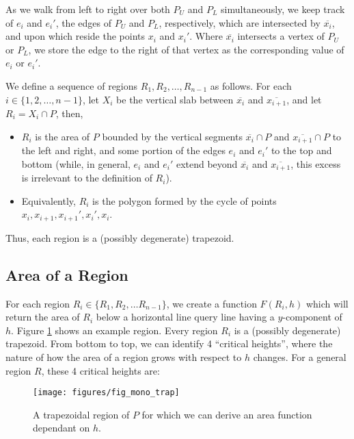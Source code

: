 As we walk from left to right over both $P_U$ and $P_L$ simultaneously, we keep track of $e_i$ and $e_i'$, the edges of $P_U$ and $P_L$, respectively, which are intersected by $\overline{x_i}$, and upon which reside the points $x_i$ and $x_i'$. Where $\overline{x_i}$ intersects a vertex of $P_U$ or $P_L$, 
we store the edge to the right of that vertex as the corresponding value of $e_i$ or $e_i'$.

We define a sequence of regions $R_1, R_2, \dots, R_{n-1}$ as follows. For each $i \in \{1, 2, \ldots, n-1\}$, let $X_i$ be the vertical slab between $\overline{x_i}$ and $\overline{x_{i+1}}$, and let $R_i = X_i \cap P$, then,

\begin{itemize}
 \item $R_i$ is the area of $P$ bounded by the vertical segments $\overline{x_i} \cap P$ and $\overline{x_{i+1}} \cap P$ to the left and right, and some portion of the edges $e_i$ and $e_i'$ to the top and bottom (while, in general, $e_i$ and  $e_i'$ extend beyond $\overline{x_i}$ and $\overline{x_{i+1}}$, this excess is irrelevant to the definition of $R_i$).
 
 \item Equivalently, $R_i$ is the polygon formed by the cycle of points $x_i, x_{i+1}, x_{i+1}', x_i', x_i$.
\end{itemize}

\noindent
Thus, each region is a (possibly degenerate) trapezoid.


\subsection{Area of a Region}
\label{sec:region_area}

For each region $R_i \in \{R_1, R_2, \ldots R_{n-1}\}$, we create a function $F(R_i, h)$ which will return the area of $R_i$ below a horizontal line query line having a $y$-component of $h$. Figure \ref{fig:monotonep:trapezoid} shows an example region. Every region $R_i$ is a (possibly degenerate) trapezoid. From bottom to top, we can identify 4 ``critical heights'', where the nature of how the area of a region grows with respect to $h$ changes.  For a general region $R$, these 4 critical heights are:

\begin{figure}
\begin{center}
  \texttt{[image: figures/fig\_mono\_trap]}
  \caption[A trapezoidal region of $P$.]{A trapezoidal region of $P$ for which we can derive an area function dependant on $h$.}
  \label{fig:monotonep:trapezoid}
\end{center}
\end{figure}

